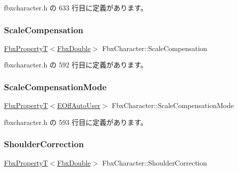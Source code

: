  fbxcharacter.\+h の 633 行目に定義があります。

\mbox{\label{class_fbx_character_a194a407eb876f08cfca8740d58fdea77}} 
\subsubsection{\texorpdfstring{Scale\+Compensation}{ScaleCompensation}}
{\footnotesize\ttfamily \hyperlink{class_fbx_property_t}{Fbx\+PropertyT}$<$\hyperlink{fbxtypes_8h_a171e72a1c46fc15c1a6c9c31948c1c5b}{Fbx\+Double}$>$ Fbx\+Character\+::\+Scale\+Compensation}



 fbxcharacter.\+h の 592 行目に定義があります。

\mbox{\label{class_fbx_character_afe6b3b37bf087b1a2934873067cad2ab}} 
\subsubsection{\texorpdfstring{Scale\+Compensation\+Mode}{ScaleCompensationMode}}
{\footnotesize\ttfamily \hyperlink{class_fbx_property_t}{Fbx\+PropertyT}$<$\hyperlink{class_fbx_character_ab698a180e6f900ba8317257749c2ecce}{E\+Off\+Auto\+User}$>$ Fbx\+Character\+::\+Scale\+Compensation\+Mode}



 fbxcharacter.\+h の 593 行目に定義があります。

\mbox{\label{class_fbx_character_a970018e5956d90bc16b309a23e6ab081}} 
\subsubsection{\texorpdfstring{Shoulder\+Correction}{ShoulderCorrection}}
{\footnotesize\ttfamily \hyperlink{class_fbx_property_t}{Fbx\+PropertyT}$<$\hyperlink{fbxtypes_8h_a171e72a1c46fc15c1a6c9c31948c1c5b}{Fbx\+Double}$>$ Fbx\+Character\+::\+Shoulder\+Correction}



